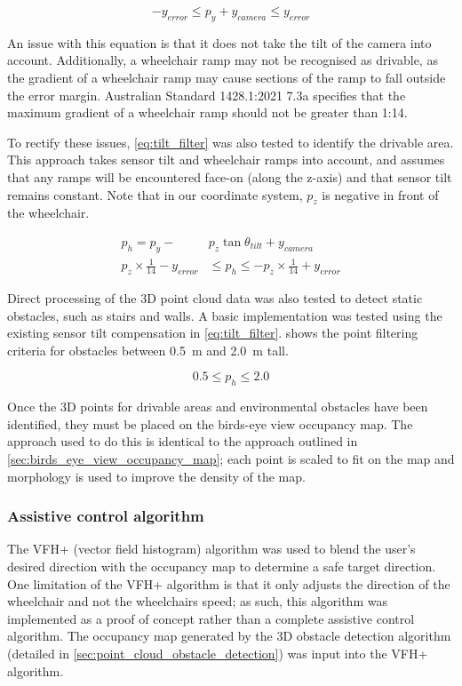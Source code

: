 \begin{equation}
-y_{error} \leq p_y + y_{camera} \leq y_{error}
\label{eq:flat_filter}
\end{equation}

An issue with this equation is that it does not take the tilt of the camera into account.
Additionally, a wheelchair ramp may not be recognised as drivable, as the gradient of a wheelchair ramp
may cause sections of the ramp to fall outside the error margin.
Australian Standard 1428.1:2021 7.3a \cite{standardsaustralia14282021Design2021} specifies that
the maximum gradient of a wheelchair ramp should not be greater than 1:14.

To rectify these issues, \cref{eq:tilt_filter} was also tested to identify the drivable area.
This approach takes sensor tilt and wheelchair ramps into account,
and assumes that any ramps will be encountered face-on (along the z-axis) and that
sensor tilt remains constant. Note that in our coordinate system,
$p_z$ is negative in front of the wheelchair.

\begin{equation}
\begin{split}
p_h = p_y - &p_z\tan\theta_{tilt} + y_{camera}\\
p_z\times\frac{1}{14} - y_{error} &\leq p_h \leq -p_z\times\frac{1}{14} + y_{error}
\end{split}
\label{eq:tilt_filter}
\end{equation}

Direct processing of the 3D point cloud data was also tested to detect static obstacles,
such as stairs and walls. A basic implementation was tested using the existing sensor
tilt compensation in \cref{eq:tilt_filter}.  shows the point filtering
criteria for obstacles between \SI{0.5}{\metre} and \SI{2.0}{\metre} tall.

\begin{equation}
0.5 \leq p_h \leq 2.0
\label{eq:obstacle_filter}
\end{equation}

Once the 3D points for drivable areas and environmental obstacles have been identified,
they must be placed on the birds-eye view occupancy map. The approach used to do this
is identical to the approach outlined in \cref{sec:birds_eye_view_occupancy_map};
each point is scaled to fit on the map and morphology is used to improve the density
of the map.

\subsubsection{Assistive control algorithm}
The VFH+ (vector field histogram) algorithm \cite{ulrichVFHReliableObstacle1998} was used to blend
the user's desired direction with the occupancy map to determine a safe target direction.
One limitation of the VFH+ algorithm is that it only adjusts the direction of the wheelchair
and not the wheelchairs speed; as such, this algorithm was implemented as a
proof of concept rather than a complete assistive control algorithm.
The occupancy map generated by the 3D obstacle detection algorithm (detailed in \cref{sec:point_cloud_obstacle_detection})
was input into the VFH+ algorithm.

